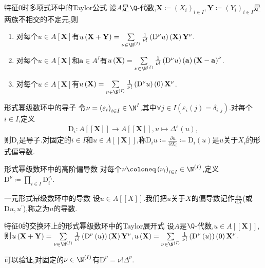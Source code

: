 \begin{corollary}{特征$0$时多项式环中的Taylor公式}{}
	设$A$是$\Q$-代数,$\mathbf{X}\coloneq(X_{i})_{i\in I},\mathbf{Y}\coloneq\left(Y_{i}\right)_{i\in I}$是两族不相交的不定元,则
	\begin{enumerate}
		\item 对每个$u\in A[\mathbf{X}]$有$u\left(\mathbf{X}+\mathbf{Y}\right)=\sum\limits_{\nu\in\N^{\left(I\right)}}\frac{1}{\nu!}\left(\mathrm{D}^{\nu}u\right)\left(\mathbf{X}\right)\mathbf{Y}^{\nu}$.
		\item 对每个$u\in A[\mathbf{X}]$和$\mathbf{a}\in A^{I}$有$u\left(\mathbf{X}\right)=\sum\limits_{\nu\in\N^{\left(I\right)}}\frac{1}{\nu!}\left(\mathrm{D}^{\nu}u\right)\left(\mathbf{a}\right)\left(\mathbf{X}-\mathbf{a}\right)^{\nu}$.
		\item 对每个$u\in A[\mathbf{X}]$有$u\left(\mathbf{X}\right)=\sum\limits_{\nu\in\N^{\left(I\right)}}\frac{1}{\nu!}\left(\mathrm{D}^{\nu}u\right)\left(0\right)\mathbf{X}^{\nu}$.
	\end{enumerate}
\end{corollary}

\begin{definition}{形式幂级数环中的导子}{}
	令$\nu=\left(\varepsilon_{i}\right)_{i\in I}\in\N^{I}$,其中$\forall j\in I\left(\varepsilon_{i}\left(j\right)=\delta_{i,j}\right)$.对每个$i\in I$,定义
	\begin{align*}
		\mathrm{D}_{i}:A[[\mathbf{X}]]\to A[[\mathbf{X}]],u\mapsto\Delta^{\varepsilon}\left(u\right),
	\end{align*}
	则$\mathrm{D}_{i}$是导子.对固定的$i\in I$和$u\in A[[\mathbf{X}]]$,称$\mathrm{D}_{i}u\coloneq\frac{\partial u}{\partial X_{i}}\coloneq\mathrm{D}_{i}\left(u\right)$是$u$关于$X_{i}$的形式偏导数.
\end{definition}

\begin{definition}{形式幂级数环中的高阶偏导数}{}
	对每个$\nu\coloneq\left(\nu_{i}\right)_{i\in I}\in\N^{\left(I\right)}$,定义$\mathrm{D}^{\nu}\coloneq\prod\limits_{i\in I}\mathrm{D}_{i}^{\nu_{i}}$.
\end{definition}

\begin{definition}{一元形式幂级数环中的导数}{}
	设$u\in A[[X]]$.我们把$u$关于$X$的偏导数记作$\frac{\mathrm{d}u}{\mathrm{d}X}$(或$\mathrm{D}u,u^{\prime}$),称之为$u$的导数.
\end{definition}

\begin{proposition}{特征$0$的交换环上的形式幂级数环中的Taylor展开式}{}
	设$A$是$\Q$-代数,$u\in A[[\mathbf{X}]]$,则$u\left(\mathbf{X}+\mathbf{Y}\right)=\sum\limits_{\nu\in\N^{\left(I\right)}}\frac{1}{\nu!}\left(\mathrm{D}^{\nu}\left(u\right)\right)\left(\mathbf{X}\right)\mathbf{Y}^{\nu},u\left(\mathbf{X}\right)=\sum\limits_{\nu\in\N^{\left(I\right)}}\frac{1}{\nu!}\left(\mathrm{D}^{\nu}\left(u\right)\right)\left(0\right)\mathbf{X}^{\nu}$.
\end{proposition}

\begin{remark}{}{}
	可以验证,对固定的$\nu\in\N^{\left(I\right)}$有$\mathrm{D}^{\nu}=\nu!\Delta^{\nu}$.
\end{remark}


